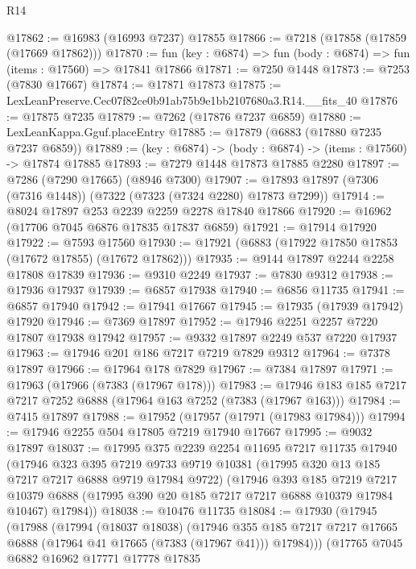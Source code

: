 \begin{lexlean}{R14}
\begin{coremodule}
@17862 := @16983 (@16993 @7237) @17855
@17866 := @7218 (@17858 (@17859 (@17669 @17862)))
@17870 := fun (key : @6874) => fun (body : @6874) => fun (items : @17560) => @17841 @17866
@17871 := @7250 @1448
@17873 := @7253 (@7830 @17667)
@17874 := @17871 @17873
@17875 := LexLeanPreserve.Cec07f82ce0b91ab75b9e1bb2107680a3.R14.__fits_40
@17876 := @17875 @7235
@17879 := @7262 (@17876 @7237 @6859)
@17880 := LexLeanKappa.Gguf.placeEntry
@17885 := @17879 (@6883 (@17880 @7235 @7237 @6859))
@17889 := (key : @6874) -> (body : @6874) -> (items : @17560) -> @17874 @17885
@17893 := @7279 @1448 @17873 @17885 @2280
@17897 := @7286 (@7290 @17665) (@8946 @7300)
@17907 := @17893 @17897 (@7306 (@7316 @1448)) (@7322 (@7323 (@7324 @2280) @17873 @7299))
@17914 := @8024 @17897 @253 @2239 @2259 @2278 @17840 @17866
@17920 := @16962 (@17706 @7045 @6876 @17835 @17837 @6859)
@17921 := @17914 @17920
@17922 := @7593 @17560
@17930 := @17921 (@6883 (@17922 @17850 @17853 (@17672 @17855) (@17672 @17862)))
@17935 := @9144 @17897 @2244 @2258 @17808 @17839
@17936 := @9310 @2249
@17937 := @7830 @9312
@17938 := @17936 @17937
@17939 := @6857 @17938
@17940 := @6856 @11735
@17941 := @6857 @17940
@17942 := @17941 @17667
@17945 := @17935 (@17939 @17942) @17920
@17946 := @7369 @17897
@17952 := @17946 @2251 @2257 @7220 @17807 @17938 @17942
@17957 := @9332 @17897 @2249 @537 @7220 @17937
@17963 := @17946 @201 @186 @7217 @7219 @7829 @9312
@17964 := @7378 @17897
@17966 := @17964 @178 @7829
@17967 := @7384 @17897
@17971 := @17963 (@17966 (@7383 (@17967 @178)))
@17983 := @17946 @183 @185 @7217 @7217 @7252 @6888 (@17964 @163 @7252 (@7383 (@17967 @163)))
@17984 := @7415 @17897
@17988 := @17952 (@17957 (@17971 (@17983 @17984)))
@17994 := @17946 @2255 @504 @17805 @7219 @17940 @17667
@17995 := @9032 @17897
@18037 := @17995
    @375
    @2239
    @2254
    @11695
    @7217
    @11735
    @17940
    (@17946
      @323
      @395
      @7219
      @9733
      @9719
      @10381
      (@17995 @320 @13 @185 @7217 @7217 @6888 @9719 @17984 @9722)
      (@17946
        @393
        @185
        @7219
        @7217
        @10379
        @6888
        (@17995 @390 @20 @185 @7217 @7217 @6888 @10379 @17984 @10467)
        @17984))
@18038 := @10476 @11735
@18084 := @17930
    (@17945
      (@17988
        (@17994
          (@18037 @18038)
          (@17946
            @355
            @185
            @7217
            @7217
            @17665
            @6888
            (@17964 @41 @17665 (@7383 (@17967 @41)))
            @17984)))
      (@17765
        @7045
        @6882
        @16962
        @17771
        @17778
        @17835

\end{coremodule}
\end{lexlean}
